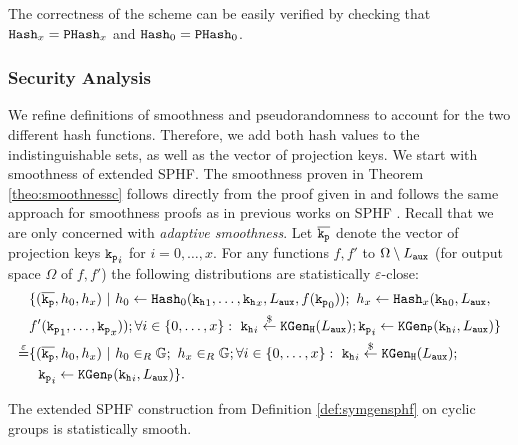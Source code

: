\noindent
The correctness of the scheme can be easily verified by checking that $\mathtt{Hash}_x=\mathtt{PHash}_x$ and $\mathtt{Hash}_0=\mathtt{PHash}_0$.

\subsubsection{Security Analysis}
We refine definitions of smoothness and pseudorandomness to account for the two different hash functions.
Therefore, we add both hash values to the indistinguishable sets, as well as the vector of projection keys.
We start with smoothness of extended \ac{SPHF}.
The smoothness proven in Theorem \ref{theo:smoothnessc} follows directly from the proof given in \cite[Appendix D.3]{cryptoeprint:2013:034} and follows the same approach for smoothness proofs as in previous works on \ac{SPHF} \cite{cryptoeprint:2013:034,Gennaro2003,Katz2011}.
Recall that we are only concerned with \emph{adaptive smoothness}.
Let $\overline{\mathtt{k_p}}$ denote the vector of projection keys $\mathtt{k_p}_i$ for $i=0,\dots,x$.
For any functions $f,f'$ to $\Omega\setminus L_\mathtt{aux}$ (for output space $\Omega$ of $f,f'$) the following distributions are statistically $\varepsilon$-close:
\begin{align*}
& \{(\overline{\mathtt{k_p}},h_0,h_x) ~|~ h_0\gets\mathtt{Hash}_0(\mathtt{k_h}_1,\dots,\mathtt{k_h}_x,L_\mathtt{aux},f(\mathtt{k_p}_0));~ h_x\gets\mathtt{Hash}_x(\mathtt{k_h}_0,L_\mathtt{aux}, \\
& f'(\mathtt{k_p}_1,\dots,\mathtt{k_p}_x)); \forall i\in\{0,\dots,x\}:~ \mathtt{k_h}_i\stackrel{\$}{\gets}\mathtt{KGen_H}(L_\mathtt{aux}); \mathtt{k_p}_i\gets\mathtt{KGen_P}(\mathtt{k_h}_i,L_\mathtt{aux})\} \\
\stackrel{\varepsilon}{=} & \{(\overline{\mathtt{k_p}},h_0,h_x) ~|~ h_0\in_R\mathbb{G};~ h_x\in_R\mathbb{G}; \forall i\in\{0,\dots,x\}:~ \mathtt{k_h}_i\stackrel{\$}{\gets}\mathtt{KGen_H}(L_\mathtt{aux}); \\
& ~~\mathtt{k_p}_i\gets\mathtt{KGen_P}(\mathtt{k_h}_i,L_\mathtt{aux})\}.
\end{align*}

\begin{theorem}\label{theo:smoothnessc}
The extended \ac{SPHF} construction from Definition \ref{def:symgensphf} on cyclic groups is statistically smooth.
\end{theorem}

